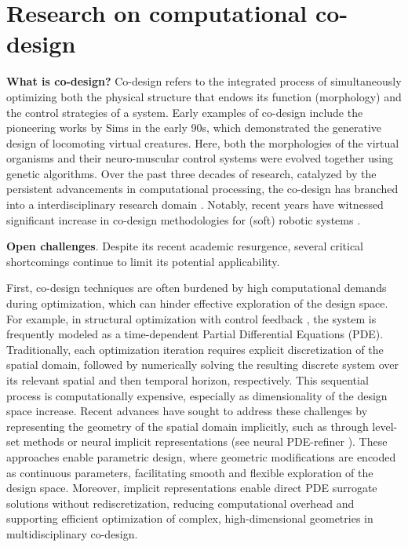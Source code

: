 \section*{\textbf{Research on computational co-design}}

\textbf{What is co-design?} Co-design refers to the integrated process
of simultaneously optimizing both the physical structure that endows its
function (morphology) and the control strategies of a system. Early
examples of co-design include the pioneering works by Sims
\cite{sims1994evolving,sims1991artificial} in the early 90s, which
demonstrated the generative design of locomoting virtual creatures.
Here, both the morphologies of the virtual organisms and their
neuro-muscular control systems were evolved together using genetic
algorithms. Over the past three decades of research, catalyzed by the
persistent advancements in computational processing, the co-design has
branched into a interdisciplinary research domain
\cite{mirzendehdel2023codesign}. Notably, recent years have witnessed
significant increase in co-design methodologies for (soft) robotic
systems
\cite{sato2023topology,sato2024computational,allison2013plantlimited,bravopalacios2020one}.

\textbf{Open challenges}. Despite its recent academic resurgence,
several critical shortcomings continue to limit its potential
applicability.

First, co-design techniques are often burdened by high computational
demands during optimization, which can hinder effective exploration of
the design space. For example, in structural optimization with control
feedback \cite{yuhn20234d,sato2024computational,strgar2025accelerated},
the system is frequently modeled as a time-dependent Partial
Differential Equations (PDE). Traditionally, each optimization iteration
requires explicit discretization of the spatial domain, followed by
numerically solving the resulting discrete system over its relevant
spatial and then temporal horizon, respectively. This sequential process
is computationally expensive, especially as dimensionality of the design
space increase. Recent advances have sought to address these challenges
by representing the geometry of the spatial domain implicitly, such as
through level-set methods or neural implicit representations (see neural
PDE-refiner \cite{lippe2023pderefiner, li2020fourier}). These approaches
enable parametric design, where geometric modifications are encoded as
continuous parameters, facilitating smooth and flexible exploration of
the design space. Moreover, implicit representations enable direct PDE
surrogate solutions without rediscretization, reducing computational
overhead and supporting efficient optimization of complex,
high-dimensional geometries in multidisciplinary co-design.

